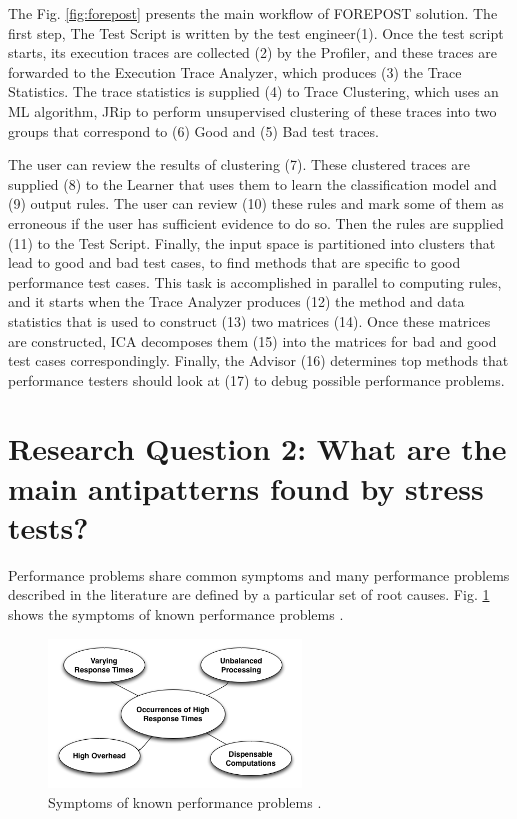 \documentclass[espaco=umemeio,chapter=TITLE,twoside,openright]{abnt}
\begin{document}
The Fig. \ref{fig:forepost} presents the main workflow of FOREPOST solution. The first step,  The Test Script is written  by the test engineer(1). Once the test script starts, its execution traces are collected (2) by the Profiler, and these traces are forwarded to the Execution Trace Analyzer, which produces (3) the Trace Statistics. The trace statistics is supplied (4) to Trace Clustering, which uses an ML algorithm, JRip to perform unsupervised clustering of these traces into two groups that correspond to (6) Good and (5) Bad test traces.

The user can review the results of clustering (7). These clustered traces are supplied (8) to the Learner that uses them to learn the classification model and (9) output rules. The user can review (10) these rules and mark some of them as erroneous if the user has sufficient evidence to do so. Then the rules are supplied (11) to the Test Script. Finally, the input space is partitioned into clusters that lead to good and bad test cases, to find methods that are specific to good performance test cases. This task is accomplished in parallel to computing rules, and it starts when the Trace Analyzer produces (12) the method and data statistics that is used to construct (13) two matrices (14). Once these matrices are constructed, ICA decomposes them (15) into the matrices for bad and good test cases correspondingly. Finally, the Advisor (16) determines top methods that performance testers should look at (17) to debug possible performance problems.




\section{Research Question 2: What are the main antipatterns found by stress tests?}

 Performance problems share common symptoms and many performance problems described in the literature are defined by a particular set of root causes. Fig. \ref{fig:symptoms}  shows the symptoms of known performance problems \cite{Wert2013a}.



\begin{figure}[h]
\centering
\includegraphics[width=0.6\textwidth]{./images/Symptoms.png}
\caption{Symptoms of known performance problems \cite{Wert2013a}. }
\label{fig:symptoms}
\end{figure}
\end{document}

